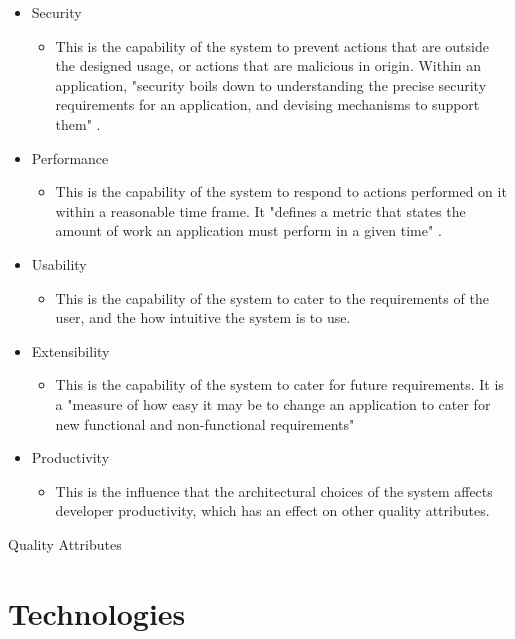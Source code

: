 \begin{itemize}
\item Security
\begin{itemize}
\item This is the capability of the system to prevent actions that are outside the designed usage, or actions that are malicious in origin. Within an application, "security boils down to understanding the precise security requirements for an application, and devising mechanisms to support them" \parencite{gorton2006essential}.
\end{itemize}
\item Performance
\begin{itemize}
\item This is the capability of the system to respond to actions performed on it within a reasonable time frame. It "defines a metric that states the amount of work an application must perform in a given time" \parencite{gorton2006essential}.
\end{itemize}
\item Usability
\begin{itemize}
\item This is the capability of the system to cater to the requirements of the user, and the how intuitive the system is to use.
\end{itemize}
\item Extensibility
\begin{itemize}
\item This is the capability of the system to cater for future requirements. It is a "measure of how easy it may be to change an application to cater for new functional and non-functional requirements" \parencite{gorton2006essential}
\end{itemize}
\item Productivity
\begin{itemize}
\item This is the influence that the architectural choices of the system affects developer productivity, which has an effect on other quality attributes.
\end{itemize}
\end{itemize}
\begin{table}[H]
\caption{Quality Attributes}
\label{fig:qualityAttributes}
\end{table}

\section{Technologies}

